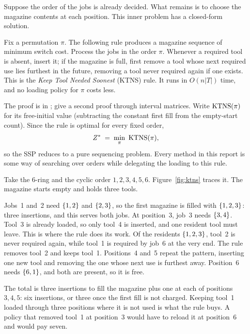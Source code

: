 Suppose the order of the jobs is already decided. What remains is to choose the
magazine contents at each position. This inner problem has a closed-form solution.

\begin{proposition}\label{prop:ktns}
Fix a permutation $\pi$. The following rule produces a magazine sequence of minimum
switch cost. Process the jobs in the order $\pi$. Whenever a required tool is
absent, insert it; if the magazine is full, first remove a tool whose next required
use lies furthest in the future, removing a tool never required again if one
exists. This is the \emph{Keep Tool Needed Soonest} (KTNS) rule. It runs in
$O(n\lvert T\rvert)$ time, and no loading policy for $\pi$ costs less.
\end{proposition}

The proof is in \citet{Tang1988}; \citet{Crama1994} give a second proof through
interval matrices. Write $\operatorname{KTNS}(\pi)$ for its free-initial value (subtracting the
constant first fill from the empty-start count). Since the rule is optimal for every
fixed order,
\[
  Z^{\ast} \;=\; \min_{\pi}\ \operatorname{KTNS}(\pi),
\]
so the SSP reduces to a pure sequencing problem. Every method in this report is
some way of searching over orders while delegating the loading to this rule.

\begin{example}\label{ex:ktns}
Take the $6$-ring and the cyclic order $1,2,3,4,5,6$. Figure~\ref{fig:ktns} traces
it. The magazine starts empty and holds three tools.

Jobs~1 and~2 need $\{1,2\}$ and $\{2,3\}$, so the first magazine is filled
with $\{1,2,3\}$: three insertions, and this serves both jobs. At position~3,
job~3 needs $\{3,4\}$. Tool~3 is already loaded, so only tool~4 is inserted, and
one resident tool must leave. This is where the rule does its work. Of the residents
$\{1,2,3\}$, tool~2 is never required again, while tool~1 is required by job~6 at
the very end. The rule removes tool~2 and keeps tool~1. Positions~4 and~5 repeat the
pattern, inserting one new tool and removing the one whose next use is furthest
away. Position~6 needs $\{6,1\}$, and both are present, so it is free.

The total is three insertions to fill the magazine plus one at each of positions
$3,4,5$: six insertions, or three once the first fill is not charged. Keeping tool~1
loaded through three positions where it is not used is what the rule buys. A policy
that removed tool~1 at position~3 would have to reload it at position~6 and would
pay seven.
\end{example}

